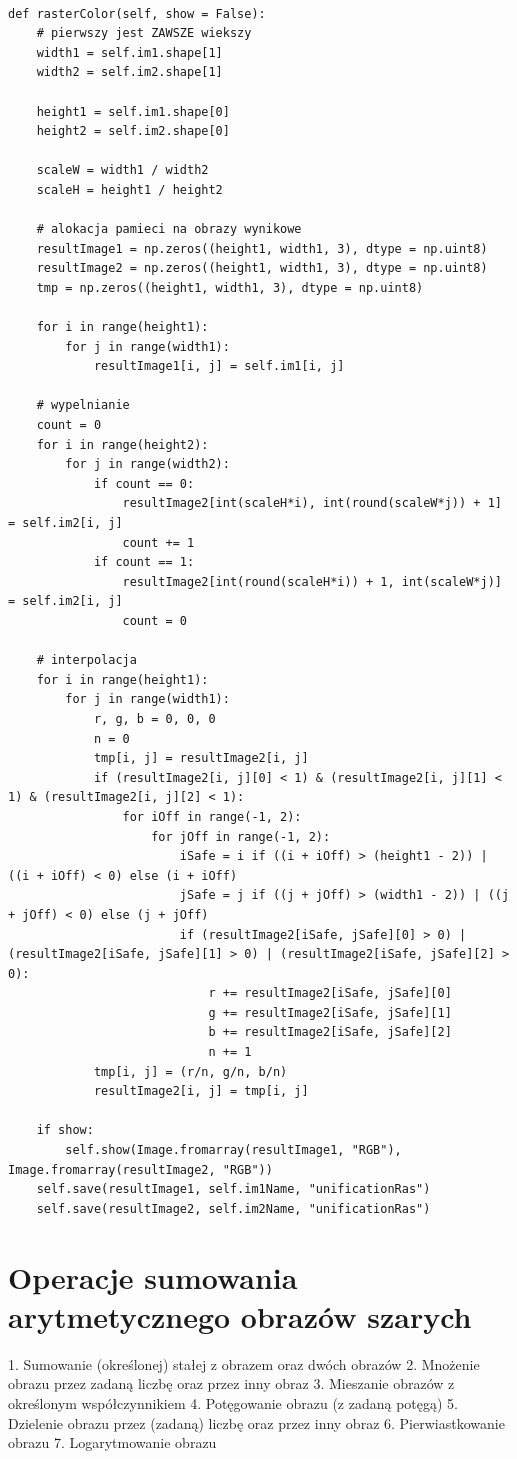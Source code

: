 \documentclass[final,a4paper,openany,12pt]{mwbk}
\begin{document}
\begin{lstlisting}[caption=Rastrowe ujednolicanie obrazów barwnych]

def rasterColor(self, show = False):
	# pierwszy jest ZAWSZE wiekszy
	width1 = self.im1.shape[1]
	width2 = self.im2.shape[1]
	
	height1 = self.im1.shape[0]
	height2 = self.im2.shape[0]
	
	scaleW = width1 / width2
	scaleH = height1 / height2
	
	# alokacja pamieci na obrazy wynikowe
	resultImage1 = np.zeros((height1, width1, 3), dtype = np.uint8)
	resultImage2 = np.zeros((height1, width1, 3), dtype = np.uint8)
	tmp = np.zeros((height1, width1, 3), dtype = np.uint8)
	
	for i in range(height1):
		for j in range(width1):
			resultImage1[i, j] = self.im1[i, j]
	
	# wypelnianie
	count = 0
	for i in range(height2):
		for j in range(width2):
			if count == 0:
				resultImage2[int(scaleH*i), int(round(scaleW*j)) + 1] = self.im2[i, j]
				count += 1
			if count == 1:
				resultImage2[int(round(scaleH*i)) + 1, int(scaleW*j)] = self.im2[i, j]
				count = 0
	
	# interpolacja
	for i in range(height1):
		for j in range(width1):
			r, g, b = 0, 0, 0
			n = 0
			tmp[i, j] = resultImage2[i, j]
			if (resultImage2[i, j][0] < 1) & (resultImage2[i, j][1] < 1) & (resultImage2[i, j][2] < 1):
				for iOff in range(-1, 2):
					for jOff in range(-1, 2):
						iSafe = i if ((i + iOff) > (height1 - 2)) | ((i + iOff) < 0) else (i + iOff)
						jSafe = j if ((j + jOff) > (width1 - 2)) | ((j + jOff) < 0) else (j + jOff)
						if (resultImage2[iSafe, jSafe][0] > 0) | (resultImage2[iSafe, jSafe][1] > 0) | (resultImage2[iSafe, jSafe][2] > 0):
							r += resultImage2[iSafe, jSafe][0]
							g += resultImage2[iSafe, jSafe][1]
							b += resultImage2[iSafe, jSafe][2]
							n += 1
			tmp[i, j] = (r/n, g/n, b/n)
			resultImage2[i, j] = tmp[i, j]
	
	if show:
		self.show(Image.fromarray(resultImage1, "RGB"), Image.fromarray(resultImage2, "RGB"))
	self.save(resultImage1, self.im1Name, "unificationRas")
	self.save(resultImage2, self.im2Name, "unificationRas")

\end{lstlisting}










\chapter{Operacje sumowania arytmetycznego obrazów szarych}
1. Sumowanie (określonej) stałej z obrazem oraz dwóch obrazów
2. Mnożenie obrazu przez zadaną liczbę oraz przez inny obraz
3. Mieszanie obrazów z określonym współczynnikiem
4. Potęgowanie obrazu (z zadaną potęgą)
5. Dzielenie obrazu przez (zadaną) liczbę oraz przez inny obraz
6. Pierwiastkowanie obrazu
7. Logarytmowanie obrazu
\end{document}
